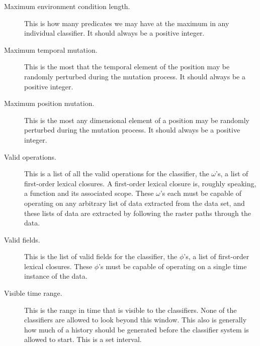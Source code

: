 \begin{description}
\item [Maximum environment condition length.]
\label{sec:maximum-environment-condition-length}
This is how many predicates we may have at the maximum in any individual classifier.
It should always be a positive integer.
\item [Maximum temporal mutation.]
\label{sec:maximum-temporal-mutation}
This is the most that the temporal element of the position may be randomly perturbed during the mutation process.
It should always be a positive integer.
\item [Maximum position mutation.]
\label{sec:maximum-position-mutation}
This is the most any dimensional element of a position may be randomly perturbed during the mutation process.
It should always be a positive integer.
\item [Valid operations.]
This is a list of all the valid operations for the classifier, the $\omega$'s, a list of first-order lexical closures.
A first-order lexical closure is, roughly speaking, a function and its associated scope.
These $\omega$'s each must be capable of operating on any arbitrary list of data extracted from the data set, and these lists of data are extracted by following the raster paths through the data.
\item [Valid fields.]
This is the list of valid fields for the classifier, the $\phi$'s, a list of first-order lexical closures.
These $\phi$'s must be capable of operating on a single time instance of the data.
\item [Visible time range.]
This is the range in time that is visible to the classifiers.
None of the classifiers are allowed to look beyond this window.
This also is generally how much of a history should be generated before the classifier system is allowed to start.
This is a set interval.
\end{description}
